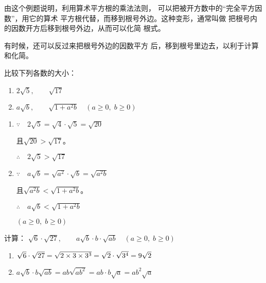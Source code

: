 由这个例题说明，利用算术平方根的乘法法则，
可以把被开方数中的“完全平方因数”，用它的算术
平方根代替，而移到根号外边。这种变形，通常叫做
把根号内的因数开方后移到根号外边，从而可以化简
根式。

有时候，还可以反过来把根号外边的因数平方
后，移到根号里边去，以利于计算和化简。
    
\begin{example}
    比较下列各数的大小：
\begin{enumerate}
    \item $2\sqrt{5},\qquad \sqrt{17}$
   \item $a\sqrt{b},\qquad \sqrt{1+a^2b}\quad  (a\ge0,\; b\ge0)$
\end{enumerate}
\end{example}

\begin{solution}
    \begin{multicols}{2}
        \begin{enumerate}
    \item $\because\quad 2\sqrt{5}=\sqrt{4}\cdot \sqrt{5}=\sqrt{20}$
    
    且$\sqrt{20}>\sqrt{17}$。
   
   $\therefore\quad  2\sqrt{5}>\sqrt{17}$

    \item $\because\quad a\sqrt{b}=\sqrt{a^2}\cdot \sqrt{b}=\sqrt{a^2b}$
    
    且$\sqrt{a^2b}<\sqrt{1+a^2b}$。

   $\therefore\quad  a\sqrt{b}<\sqrt{1+a^2b}$
   
   $(a\ge 0,\; b\ge 0)$
\end{enumerate}  
    \end{multicols}
  
\end{solution}

\begin{example}
    计算：
$\sqrt{6}\cdot \sqrt{27},\qquad a\sqrt{b}\cdot b\cdot \sqrt{ab}\quad  (a\ge0,\; b\ge0)$
\end{example}

\begin{solution}
\begin{enumerate}
    \item $\sqrt{6}\cdot \sqrt{27}=\sqrt{2\times3\times3^3}=\sqrt{2}\cdot \sqrt{3^4}=9\sqrt{2}$
    \item $a\sqrt{b}\cdot b \sqrt{ab}=ab\sqrt{ab^2}=ab\cdot b\sqrt{a}=ab^2\sqrt{a}$
\end{enumerate}
\end{solution}

